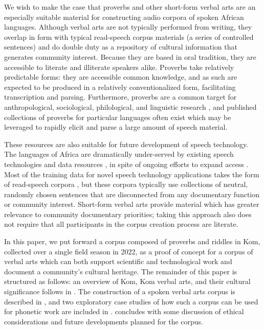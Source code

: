 \documentclass[output=paper,colorlinks,citecolor=brown
]{langscibook}
\begin{document}
We wish to make the case that proverbs and other short-form verbal arts are an especially suitable material for constructing audio corpora of spoken African languages. 
Although verbal arts are not typically performed from writing, they overlap in form with typical read-speech corpus materials (a series of controlled sentences) and do double duty as a repository of cultural information that generates community interest. 
Because they are based in oral tradition, they are accessible to literate and illiterate speakers alike. 
Proverbs take relatively predictable forms: they are accessible common knowledge, and as such are expected to be produced in a relatively conventionalized form, facilitating transcription and parsing.
Furthermore, proverbs are a common target for anthropological, sociological, philological, and linguistic research \citep{yankah-proverbs, nwachukwu2012african, tadi2016}, and published collections of proverbs for particular languages often exist which may be leveraged to rapidly elicit and parse a large amount of speech material. 

These resources are also suitable for future development of speech technology.
The languages of Africa are dramatically under-served by existing speech technologies and data resources \citep{blasi}, in spite of ongoing efforts to expand access \citep[e.g.][]{masakhane}. 
Most of the training data for novel speech technology applications takes the form of read-speech corpora \citep{van-niekerk-etal-2017, bamba2021, gauthier-etal-2016-collecting, Schlippe2012HausaLV, Nimaan2014BuildingAE, gutkin2020developing}, but these corpora typically use collections of neutral, randomly chosen sentences that are disconnected from any documentary function or community interest. 
Short-form verbal arts provide material which has greater relevance to community documentary priorities; taking this approach also does not require that all participants in the corpus creation process are literate. 

In this paper, we put forward a corpus composed of proverbs and riddles in Kom, collected over a single field season in 2022, as a proof of concept for a corpus of verbal arts which can both support scientific and technological work and document a community's cultural heritage.
The remainder of this paper is structured as follows: an overview of Kom, Kom verbal arts, and their cultural significance follows in . 
The construction of a spoken verbal arts corpus is described in , and two exploratory case studies of how such a corpus can be used for phonetic work are included in . 
 concludes with some discussion of ethical considerations and future developments planned for the corpus. 
\end{document}
